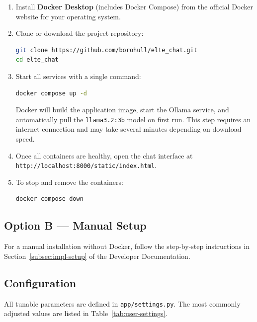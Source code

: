 \begin{enumerate}
    \item Install \textbf{Docker Desktop} (includes Docker Compose) from the official
          Docker website for your operating system.

    \item Clone or download the project repository:
\begin{lstlisting}[language=bash]
git clone https://github.com/borohull/elte_chat.git
cd elte_chat
\end{lstlisting}

    \item Start all services with a single command:
\begin{lstlisting}[language=bash]
docker compose up -d
\end{lstlisting}

    Docker will build the application image, start the Ollama service, and
    automatically pull the \texttt{llama3.2:3b} model on first run.
    This step requires an internet connection and may take several minutes
    depending on download speed.

    \item Once all containers are healthy, open the chat interface at
          \texttt{http://localhost:8000/static/index.html}.

    \item To stop and remove the containers:
\begin{lstlisting}[language=bash]
docker compose down
\end{lstlisting}
\end{enumerate}

\subsection*{Option B — Manual Setup}

For a manual installation without Docker, follow the step-by-step instructions
in Section~\ref{subsec:impl-setup} of the Developer Documentation.

\subsection*{Configuration}

All tunable parameters are defined in \texttt{app/settings.py}.
The most commonly adjusted values are listed in Table~\ref{tab:user-settings}.


